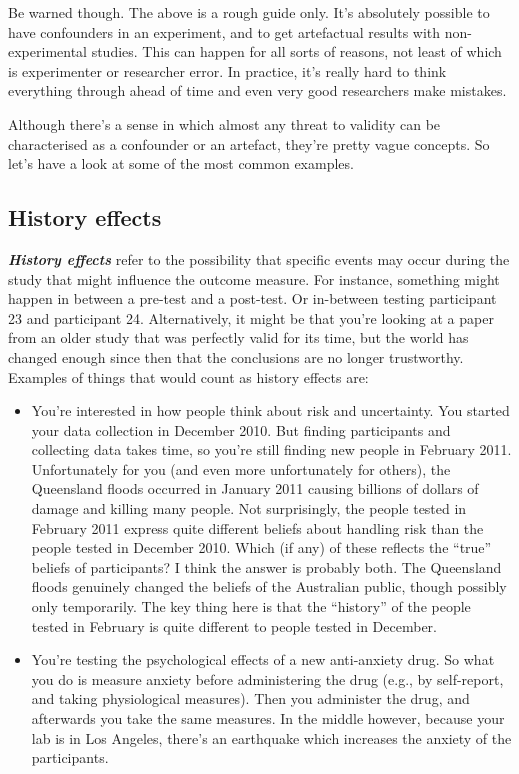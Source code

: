 \documentclass[
]{book}
\providecommand{\tightlist}{%
  \setlength{\itemsep}{0pt}\setlength{\parskip}{0pt}}
\begin{document}
Be warned though. The above is a rough guide only. It's absolutely possible to have confounders in an experiment, and to get artefactual results with non-experimental studies. This can happen for all sorts of reasons, not least of which is experimenter or researcher error. In practice, it's really hard to think everything through ahead of time and even very good researchers make mistakes.

Although there's a sense in which almost any threat to validity can be characterised as a confounder or an artefact, they're pretty vague concepts. So let's have a look at some of the most common examples.

\hypertarget{history-effects}{%
\subsection{History effects}\label{history-effects}}

\textbf{\emph{History effects}} refer to the possibility that specific events may occur during the study that might influence the outcome measure. For instance, something might happen in between a pre-test and a post-test. Or in-between testing participant 23 and participant 24. Alternatively, it might be that you're looking at a paper from an older study that was perfectly valid for its time, but the world has changed enough since then that the conclusions are no longer trustworthy. Examples of things that would count as history effects are:

\begin{itemize}
\tightlist
\item
  You're interested in how people think about risk and uncertainty. You started your data collection in December 2010. But finding participants and collecting data takes time, so you're still finding new people in February 2011. Unfortunately for you (and even more unfortunately for others), the Queensland floods occurred in January 2011 causing billions of dollars of damage and killing many people. Not surprisingly, the people tested in February 2011 express quite different beliefs about handling risk than the people tested in December 2010. Which (if any) of these reflects the ``true'' beliefs of participants? I think the answer is probably both. The Queensland floods genuinely changed the beliefs of the Australian public, though possibly only temporarily. The key thing here is that the ``history'' of the people tested in February is quite different to people tested in December.
\item
  You're testing the psychological effects of a new anti-anxiety drug. So what you do is measure anxiety before administering the drug (e.g., by self-report, and taking physiological measures). Then you administer the drug, and afterwards you take the same measures. In the middle however, because your lab is in Los Angeles, there's an earthquake which increases the anxiety of the participants.
\end{itemize}
\end{document}

